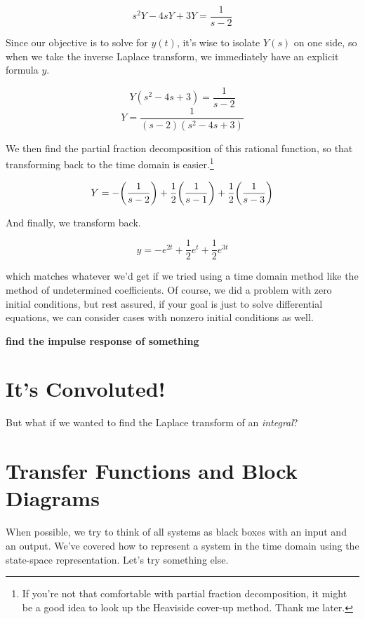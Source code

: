 \documentclass{report}
\begin{document}
\begin{onehalfspacing}
\begin{flushleft}
\vspace{-0.1in}
\[s^2 Y - 4 sY + 3 Y = \frac{1}{s-2}\]

Since our objective is to solve for \(y(t)\), it's wise to isolate \(Y(s)\) on one side, so when we take the inverse Laplace transform, we immediately have an explicit formula \(y\).

\vspace{-0.1in}
\[Y (s^2 - 4 s + 3) = \frac{1}{s-2}\]
\[Y = \frac{1}{(s-2)(s^2 - 4 s + 3)}\]

We then find the partial fraction decomposition of this rational function, so that transforming back to the time domain is easier.\footnote{If you're not that comfortable with partial fraction decomposition, it might be a good idea to look up the Heaviside cover-up method. Thank me later.}

\vspace{-0.1in}
\[Y = -\qty(\frac{1}{s-2}) + \frac{1}{2}\qty(\frac{1}{s-1}) + \frac{1}{2}\qty(\frac{1}{s-3})\]

And finally, we transform back.

\vspace{-0.1in}
\[y = -e^{2t} + \frac{1}{2} e^{t} + \frac{1}{2} e^{3t}\]

which matches whatever we'd get if we tried using a time domain method like the method of undetermined coefficients. Of course, we did a problem with zero initial conditions, but rest assured, if your goal is just to solve differential equations, we can consider cases with nonzero initial conditions as well.

\textbf{find the impulse response of something}

\section{It's Convoluted!}

But what if we wanted to find the Laplace transform of an \textit{integral}?

\section{Transfer Functions and Block Diagrams}

When possible, we try to think of all systems as black boxes with an input and an output. We've covered how to represent a system in the time domain using the state-space representation. Let's try something else.

\medskip


\end{flushleft}
\end{onehalfspacing}
\end{document}
